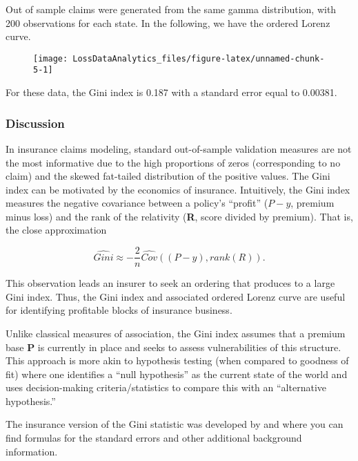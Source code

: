 \documentclass[]{book}
\theoremstyle{definition}
\theoremstyle{definition}
\theoremstyle{definition}
\theoremstyle{remark}
\begin{document}
Out of sample claims were generated from the same gamma distribution,
with 200 observations for each state. In the following, we have the
ordered Lorenz curve.

\begin{figure}

{\centering \texttt{[image: LossDataAnalytics\_files/figure-latex/unnamed-chunk-5-1]} 

}

\end{figure}

For these data, the Gini index is 0.187 with a standard error equal to
0.00381.

\subsubsection*{Discussion}\label{discussion}

In insurance claims modeling, standard out-of-sample validation measures
are not the most informative due to the high proportions of zeros
(corresponding to no claim) and the skewed fat-tailed distribution of
the positive values. The Gini index can be motivated by the economics of
insurance. Intuitively, the Gini index measures the negative covariance
between a policy's ``profit'' (\(P-y\), premium minus loss) and the rank
of the relativity (\textbf{R}, score divided by premium). That is, the
close approximation

\[\widehat{Gini} \approx - \frac{2}{n} \widehat{Cov} \left( (P-y), rank(R) \right) .\]

This observation leads an insurer to seek an ordering that produces to a
large Gini index. Thus, the Gini index and associated ordered Lorenz
curve are useful for identifying profitable blocks of insurance
business.

Unlike classical measures of association, the Gini index assumes that a
premium base \textbf{P} is currently in place and seeks to assess
vulnerabilities of this structure. This approach is more akin to
hypothesis testing (when compared to goodness of fit) where one
identifies a ``null hypothesis'' as the current state of the world and
uses decision-making criteria/statistics to compare this with an
``alternative hypothesis.''

The insurance version of the Gini statistic was developed by
\citep{frees2011summarizing} and \citep{frees2014insurance} where you
can find formulas for the standard errors and other additional
background information.
\end{document}
